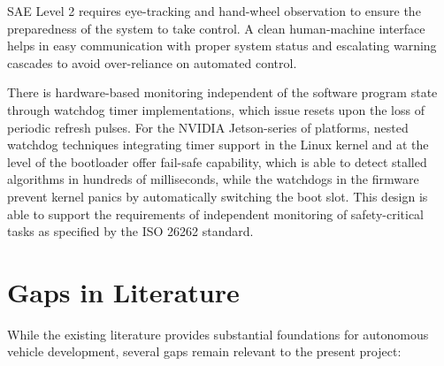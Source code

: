 \documentclass[12pt, a4paper]{report}
\begin{document}
SAE Level 2 requires eye-tracking and hand-wheel observation to ensure the preparedness of the system to take control. A clean human-machine interface helps in easy communication with proper system status and escalating warning cascades to avoid over-reliance on automated control.

There is hardware-based monitoring independent of the software program state through watchdog timer implementations, which issue resets upon the loss of periodic refresh pulses. For the NVIDIA Jetson-series of platforms, nested watchdog techniques integrating timer support in the Linux kernel and at the level of the bootloader offer fail-safe capability, which is able to detect stalled algorithms in hundreds of milliseconds, while the watchdogs in the firmware prevent kernel panics by automatically switching the boot slot. This design is able to support the requirements of independent monitoring of safety-critical tasks as specified by the ISO 26262 standard.
\section{Gaps in Literature}

While the existing literature provides substantial foundations for autonomous vehicle development, several gaps remain relevant to the present project:
\end{document}
